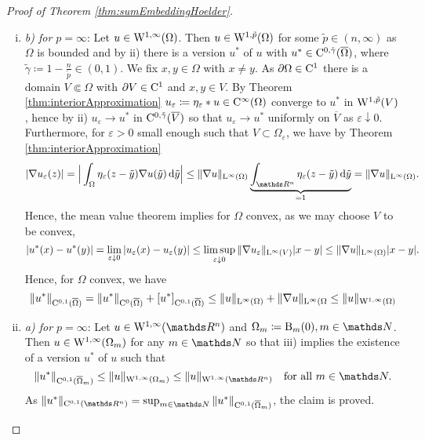 \begin{proof}[Proof of Theorem \ref{thm:sumEmbeddingHoelder}]
\begin{enumerate}[i)]
    \item \emph{b) for $p = \infty$}:
      Let $u \in \mathrm{W}^{1,\infty}(\Omega)$.
      Then $u \in \mathrm{W}^{1,\tilde p}(\Omega)$ for some $\tilde p \in (n, \infty)$ as $\Omega$ is bounded and by ii) there is a version $u^*$ of $u$ with $u^* \in \mathrm{C}^{0,\tilde\gamma}(\overline\Omega)$, where $\tilde\gamma \coloneqq 1 - \frac{n}{\tilde p} \in (0,1)$.
      We fix $x,y \in \Omega$ with $x \neq y$.
      As $\partial\Omega \in \mathrm{C}^1$ there is a domain $V \Subset \Omega$ with $\partial V \in \mathrm{C}^1$ and $x,y \in V$.
    By Theorem \ref{thm:interiorApproximation} $u_\varepsilon \coloneqq \eta_\varepsilon \ast u \in \mathrm{C}^\infty(\Omega)$ converge to $u^*$ in $\mathrm{W}^{1,\tilde p}(V)$, hence by ii) $u_\varepsilon \to u^*$ in $\mathrm{C}^{0,\tilde\gamma}(\overline V)$ so that $u_\varepsilon \to u^*$ uniformly on $\overline V$ as $\varepsilon \downarrow 0$.
    Furthermore, for $\varepsilon > 0$ small enough such that $V \subset \Omega_\varepsilon$, we have by Theorem \ref{thm:interiorApproximation}
    $$
    |\nabla u_\varepsilon(z)|
    = \Big|\int_\Omega \eta_\varepsilon (z - \tilde y) \nabla u(\tilde y) \d{\tilde y} \Big|
    \leq \| \nabla u\|_{\Ell^\infty(\Omega)} \underbrace{\int_{\R^n} \eta_\varepsilon(z - \tilde y) \d{\tilde y}}_{=1}
    = \|\nabla u\|_{\Ell^\infty(\Omega)}.
    $$
    Hence, the mean value theorem implies for $\Omega$ convex, as we may choose $V$ to be convex,
    $$
    |u^*(x) - u^*(y)|
    = \lim_{\varepsilon \downarrow 0} |u_\varepsilon(x) - u_\varepsilon(y)|
    \leq \limsup_{\varepsilon \downarrow 0} \|\nabla u_\varepsilon\|_{\mathrm{L}^\infty(V)} |x - y|
    \leq \|\nabla u\|_{\mathrm{L}^\infty(\Omega)} |x - y|.
    $$
    Hence, for $\Omega$ convex, we have
    $$
    \|u^*\|_{\mathrm{C}^{0,1}(\overline\Omega)}
    = \|u^*\|_{\mathrm{C}^0(\overline\Omega)} + [u^*]_{\mathrm{C}^{0,1}(\overline\Omega)}
    \leq \|u\|_{\mathrm{L}^\infty(\Omega)} + \|\nabla u\|_{\mathrm{L}^\infty(\Omega}
    \leq \|u\|_{\mathrm{W}^{1,\infty}(\Omega)}
    $$

  \item \emph{a) for $p = \infty$}:
    Let $u \in \WW^{1,\infty}(\R^n)$ and $\Omega_m \coloneqq \BB_m(0), m \in \N$.
    Then $u \in \mathrm{W}^{1,\infty}(\Omega_m)$ for any $m \in \N$ so that iii) implies the existence of a version $u^*$ of $u$ such that 
    $$
    \|u^*\|_{\CC^{0,1}(\overline\Omega_m)}
    \leq \|u\|_{\WW^{1,\infty}(\Omega_m)} \leq \|u\|_{\WW^{1,\infty}(\R^n)} \quad\text{for all } m \in \N.
    $$
    As $\|u^*\|_{\CC^{0,1}(\R^n)} = \sup_{m \in \N} \|u^*\|_{\CC^{0,1}(\overline\Omega_m)}$, the claim is proved.


\end{enumerate}
\end{proof}

